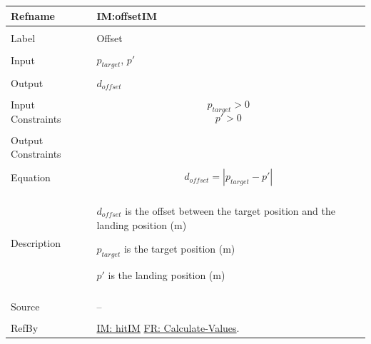 \documentclass[12pt]{article}
\begin{document}
\noindent \begin{minipage}{\textwidth}
\begin{tabular}{p{} p{}}
\toprule \textbf{Refname} & \textbf{IM:offsetIM}
\label{IM:offsetIM}
\\ \midrule \\
Label & Offset
\\ \midrule \\
Input & ${p_{target}}$, $p'$
\\ \midrule \\
Output & ${d_{offset}}$
\\ \midrule \\
Input Constraints & \begin{displaymath}
                    {p_{target}}>0
                    \end{displaymath}
                    \begin{displaymath}
                    p'>0
                    \end{displaymath}
\\ \midrule \\
Output Constraints & 
\\ \midrule \\
Equation & \begin{displaymath}
           {d_{offset}}=|{p_{target}}-p'|
           \end{displaymath}
\\ \midrule \\
Description & \begin{symbDescription}
              \item{${d_{offset}}$ is the offset between the target position and the landing position (m)}
              \item{${p_{target}}$ is the target position (m)}
              \item{$p'$ is the landing position (m)}
              \end{symbDescription}
\\ \midrule \\
Source & --
\\ \midrule \\
RefBy & \hyperref[IM:hitIM]{IM: hitIM} \hyperref[calcValues]{FR: Calculate-Values}.
\\ \bottomrule \end{tabular}
\end{minipage}
\par~
\end{document}
